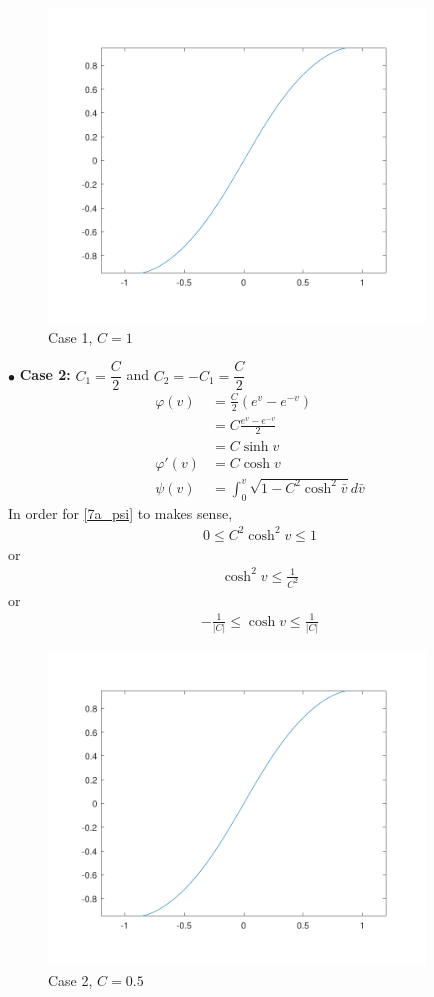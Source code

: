 \documentclass[a4paper]{report}
\DeclareMathOperator{\arcosh}{arcosh}
\begin{document}
\begin{figure}[H]
	\centering	\includegraphics[width=10cm]{7c_1}
	\caption{Case 1, $C = 1$}
\end{figure}

$\bullet$ \textbf{Case 2:} $C_1 = \dfrac{C}{2}$ and $C_2 = -C_1 = \dfrac{C}{2}$
\begin{align}
\varphi(v) &= \frac{C}{2}( e^{v} - e^{-v})\\
&= C\frac{e^{v} - e^{-v}}{2}\\
&= C \sinh v \label{7c_phi_c2}\\
\varphi'(v) &= C \cosh v\\
\psi(v) &= \int_{0}^{v} \sqrt{1 - C^2 \cosh^2 \bar{v}}d\bar{v}
\end{align}
In order for \eqref{7a_psi} to makes sense,
\begin{align}
0 \leq C^2\cosh^2 v \leq 1
\end{align}
or
\begin{align}
\cosh^2 v \leq \frac{1}{C^2} 
\end{align}
or
\begin{align}
- \frac{1}{\lvert C\rvert}  \leq \cosh v \leq \frac{1}{\lvert C\rvert} 
\end{align}

\begin{figure}[H]
	\centering	\includegraphics[width=10cm]{7c_2}
	\caption{Case 2, $C = 0.5$}
\end{figure}
\end{document}
